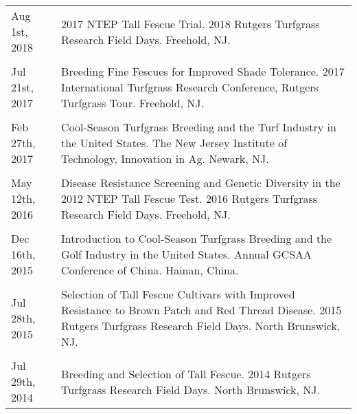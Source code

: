 \documentclass[letterpaper,11pt, english]{article}
\begin{document}
\begin{flushleft}
  \begin{tabularx}{\textwidth}{@{}lX@{}}
Aug 1st, 2018 \hspace{3cm} & 2017 NTEP Tall Fescue Trial. 2018 Rutgers Turfgrass Research Field Days. Freehold, NJ. \\
\\[-0.2cm]
Jul 21st, 2017 \hspace{3cm} & Breeding Fine Fescues for Improved Shade Tolerance. 2017 International Turfgrass Research Conference, Rutgers Turfgrass Tour. Freehold, NJ. \\
\\[-0.2cm]
Feb 27th, 2017 \hspace{3cm} & Cool-Season Turfgrass Breeding and the Turf Industry in the United States. The New Jersey Institute of Technology, Innovation in Ag. Newark, NJ. \\
\\[-0.2cm]
May 12th, 2016 \hspace{3cm} & Disease Resistance Screening and Genetic Diversity in the 2012 NTEP Tall Fescue Test. 2016 Rutgers Turfgrass Research Field Days. Freehold, NJ. \\
\\[-0.2cm]
Dec 16th, 2015 \hspace{3cm} & Introduction to Cool-Season Turfgrass Breeding and the Golf Industry in the United States. Annual GCSAA Conference of China. Hainan, China. \\
\\[-0.2cm] 
Jul 28th, 2015 \hspace{3cm} & Selection of Tall Fescue Cultivars with Improved Resistance to Brown Patch and Red Thread Disease. 2015 Rutgers Turfgrass Research Field Days. North Brunswick, NJ. \\
\\[-0.2cm] 
Jul 29th, 2014 \hspace{3cm} & Breeding and Selection of Tall Fescue. 2014 Rutgers Turfgrass Research Field Days. North Brunswick, NJ. \\
  \end{tabularx}
\end{flushleft}
\end{document}
